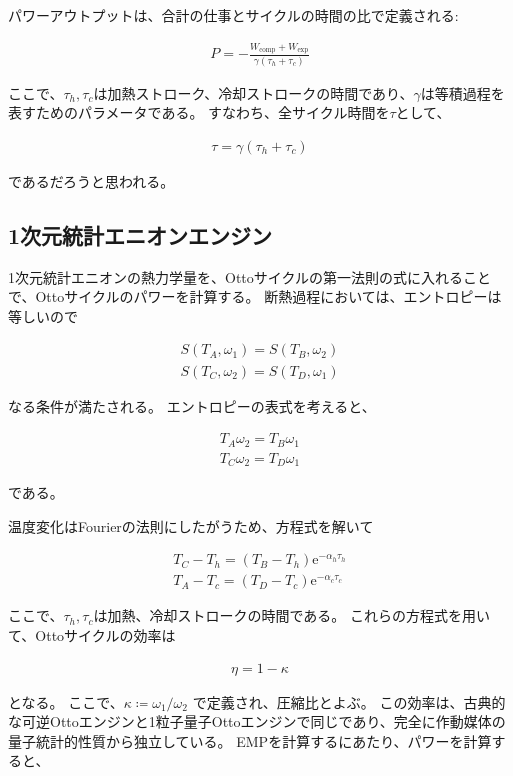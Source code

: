 \documentclass[a4paper,11pt]{jsarticle}
\numberwithin{equation}{section}
\begin{document}
パワーアウトプットは、合計の仕事とサイクルの時間の比で定義される:

\begin{align}
P=-\frac{W_{\text{comp}}+W_{\text{exp}}}{\gamma (\tau_h + \tau_c)}
\end{align}

ここで、$\tau_h ,\tau_c$は加熱ストローク、冷却ストロークの時間であり、$\gamma$は等積過程を表すためのパラメータである。
すなわち、全サイクル時間を$\tau$として、

\begin{align}
\tau=\gamma(\tau_h+\tau_c)
\end{align}

であるだろうと思われる。

\subsection{1次元統計エニオンエンジン}
1次元統計エニオンの熱力学量を、Ottoサイクルの第一法則の式に入れることで、Ottoサイクルのパワーを計算する。
断熱過程においては、エントロピーは等しいので

\begin{align}
S(T_A,\omega_1) = S(T_B,\omega_2)\\
S(T_C,\omega_2) = S(T_D,\omega_1)
\end{align}

なる条件が満たされる。
エントロピーの表式を考えると、

\begin{align}
T_A\omega_2=T_B \omega_1  \\
T_C\omega_2=T_D \omega_1
\end{align}

である。

温度変化はFourierの法則にしたがうため、方程式を解いて

\begin{align}
T_C-T_h=(T_B-T_h)\mathrm{e}^{-\alpha_h \tau_h}\\
T_A-T_c=(T_D-T_c)\mathrm{e}^{-\alpha_c \tau_c}
\end{align}

ここで、$\tau_h,\tau_c$は加熱、冷却ストロークの時間である。
これらの方程式を用いて、Ottoサイクルの効率は

\begin{align}
\eta = 1 - \kappa
\end{align}

となる。
ここで、$\kappa \coloneq \omega_1/\omega_2 $ で定義され、圧縮比とよぶ。
この効率は、古典的な可逆Ottoエンジンと1粒子量子Ottoエンジンで同じであり、完全に作動媒体の量子統計的性質から独立している。
EMPを計算するにあたり、パワーを計算すると、
\end{document}
